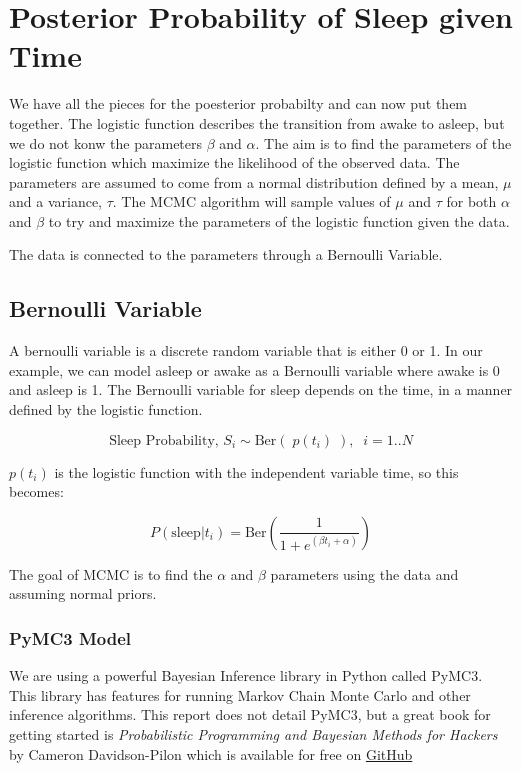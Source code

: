 \documentclass[12pt]{article}
\begin{document}
    \hypertarget{posterior-probability-of-sleep-given-time}{%
\section{Posterior Probability of Sleep given
Time}\label{posterior-probability-of-sleep-given-time}}

We have all the pieces for the poesterior probabilty and can now put
them together. The logistic function describes the transition from awake
to asleep, but we do not konw the parameters \(\beta\) and \(\alpha\).
The aim is to find the parameters of the logistic function which
maximize the likelihood of the observed data. The parameters are assumed
to come from a normal distribution defined by a mean, \(\mu\) and a
variance, \(\tau\). The MCMC algorithm will sample values of \(\mu\) and
\(\tau\) for both \(\alpha\) and \(\beta\) to try and maximize the
parameters of the logistic function given the data.

The data is connected to the parameters through a Bernoulli Variable.

\hypertarget{bernoulli-variable}{%
\subsection{Bernoulli Variable}\label{bernoulli-variable}}

A bernoulli variable is a discrete random variable that is either 0 or
1. In our example, we can model asleep or awake as a Bernoulli variable
where awake is 0 and asleep is 1. The Bernoulli variable for sleep
depends on the time, in a manner defined by the logistic function.

\[ \text{Sleep Probability, $S_i$} \sim \text{Ber}( \;p(t_i)\; ), \;\; i=1..N\]

\(p(t_i)\) is the logistic function with the independent variable time,
so this becomes:

\[ P(\text{sleep} | t_i) = \text{Ber}(\frac{1}{1 + e^{(\beta t_i + \alpha)}})\]

The goal of MCMC is to find the \(\alpha\) and \(\beta\) parameters
using the data and assuming normal priors.

    \hypertarget{pymc3-model}{%
\subsubsection{PyMC3 Model}\label{pymc3-model}}

We are using a powerful Bayesian Inference library in Python called
PyMC3. This library has features for running Markov Chain Monte Carlo
and other inference algorithms. This report does not detail PyMC3, but a
great book for getting started is \emph{Probabilistic Programming and
Bayesian Methods for Hackers} by Cameron Davidson-Pilon which is
available for free on
\href{https://github.com/CamDavidsonPilon/Probabilistic-Programming-and-Bayesian-Methods-for-Hackers}{GitHub}
\end{document}
